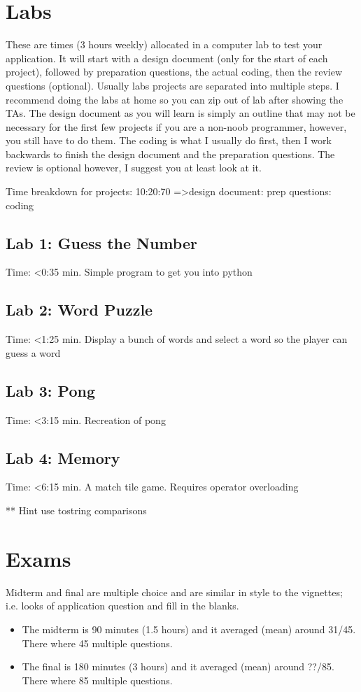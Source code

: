 \documentclass[12pt]{article}
\begin{document}
\section{Labs}
These are times (3 hours weekly) allocated in a computer lab to test your application. It will start with a design document (only for the start of each project), followed by preparation questions, the actual coding, then the review questions (optional). Usually labs projects are separated into multiple steps. I recommend doing the labs at home so you can zip out of lab after showing the TAs. The design document as you will learn is simply an outline that may not be necessary for the first few projects if you are a non-noob programmer, however, you still have to do them. The coding is what I usually do first, then I work backwards to finish the design document and the preparation questions. The review is optional however, I suggest you at least look at it. 

Time breakdown for projects: 10:20:70 =\textgreater design document: prep questions: coding
\subsection{Lab 1: Guess the Number}
Time: \textless 0:35 min.
Simple program to get you into python
\subsection{Lab 2: Word Puzzle}
Time: \textless 1:25 min.
Display a bunch of words and select a word so the player can guess a word
\subsection{Lab 3: Pong}
Time: \textless 3:15 min.
Recreation of pong
\subsection{Lab 4: Memory}
Time: \textless 6:15 min.
A match tile game. Requires operator overloading

** Hint use tostring comparisons

\section{Exams}
Midterm and final are multiple choice and are similar in style to the vignettes; i.e. looks of application question and fill in the blanks. 

\begin{itemize}
  \item The midterm is 90 minutes (1.5 hours) and it averaged (mean) around 31/45. There where 45 multiple questions.
  \item The final is 180 minutes (3 hours) and it averaged (mean) around ??/85. There where 85 multiple questions.
\end{itemize}
\end{document}
